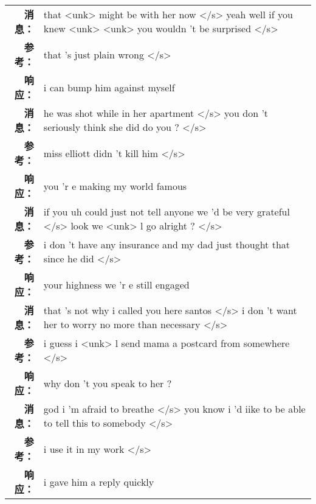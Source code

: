 \begin{tabularx}{0.8\textwidth}{@{}rX@{}}%
\toprule%
\midrule%
\textbf{消息：}&that <unk> might be with her now </s> yeah well if you knew <unk> <unk> you wouldn 't be surprised  </s>\\%
\textbf{参考：}& that 's just plain wrong </s>\\%
\textbf{响应：}&i can bump him against myself\\%
\midrule%
\textbf{消息：}&he was shot while in her apartment </s> you don 't seriously think she did do you ?  </s>\\%
\textbf{参考：}& miss elliott didn 't kill him </s>\\%
\textbf{响应：}&you 'r e making my world famous\\%
\midrule%
\textbf{消息：}&if you uh could just not tell anyone we 'd be very grateful </s> look we <unk> l go alright ?  </s>\\%
\textbf{参考：}& i don 't have any insurance and my dad just thought that since he did </s>\\%
\textbf{响应：}&your highness we 'r e still engaged\\%
\midrule%
\textbf{消息：}&that 's not why i called you here santos </s> i don 't want her to worry no more than necessary  </s>\\%
\textbf{参考：}& i guess i <unk> l send mama a postcard from somewhere </s>\\%
\textbf{响应：}&why don 't you speak to her ?\\%
\midrule%
\textbf{消息：}&god i 'm afraid to breathe </s> you know i 'd iike to be able to tell this to somebody  </s>\\%
\textbf{参考：}& i use it in my work </s>\\%
\textbf{响应：}&i gave him a reply quickly\\%
\midrule\bottomrule%
%
\end{tabularx}